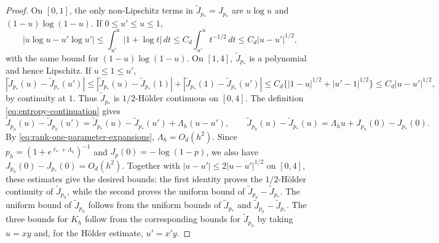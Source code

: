 \begin{proof}
On $[0,1]$, the only non-Lipschitz terms in
$\widetilde J_{p_*}=J_{p_*}$ are $u\log u$ and
$(1-u)\log(1-u)$.  If $0\le u'\le u\le1$,
\[
  |u\log u-u'\log u'|
  \le\int_{u'}^u|1+\log t|\,dt
  \le C_d\int_{u'}^ut^{-1/2}\,dt
  \le C_d|u-u'|^{1/2},
\]
with the same bound for $(1-u)\log(1-u)$.
On $[1,4]$, $\widetilde J_{p_*}$ is a polynomial and hence Lipschitz.
If $u\le1\le u'$, 
\[
  |\widetilde J_{p_*}(u)-\widetilde J_{p_*}(u')|
  \le |\widetilde J_{p_*}(u)-\widetilde J_{p_*}(1)|
    +|\widetilde J_{p_*}(1)-\widetilde J_{p_*}(u')|
  \le C_d\{|1-u|^{1/2}+|u'-1|^{1/2}\}
  \le C_d|u-u'|^{1/2},
\]
by continuity at $1$.
Thus $\widetilde J_{p_*}$ is $1/2$-H\"older continuous on $[0,4]$.
The definition \eqref{eq:entropy-continuation} gives
\[
  \widetilde J_{p_h}(u)-\widetilde J_{p_h}(u')
  =\widetilde J_{p_*}(u)-\widetilde J_{p_*}(u')
  +\Lambda_h(u-u'),
  \qquad
  \widetilde J_{p_h}(u)-\widetilde J_{p_*}(u)
  =\Lambda_hu+J_{p_h}(0)-J_{p_*}(0).
\]
By \eqref{eq:rank-one-parameter-expansions}, $\Lambda_h=O_d(h^2)$.
Since $p_h=(1+e^{\ell_*+\Lambda_h})^{-1}$ and
$J_p(0)=-\log(1-p)$, we also have
$J_{p_h}(0)-J_{p_*}(0)=O_d(h^2)$.
Together with $|u-u'|\le2|u-u'|^{1/2}$ on $[0,4]$, these estimates give the
desired bounds: the first identity proves the $1/2$-H\"older continuity of
$\widetilde J_{p_h}$, while the second proves the uniform bound of
$\widetilde J_{p_h}-\widetilde J_{p_*}$.
The uniform bound of $\widetilde J_{p_h}$ follows from the uniform bounds of
$\widetilde J_{p_*}$ and $\widetilde J_{p_h}-\widetilde J_{p_*}$.
The three bounds for $K_h$ follow from the corresponding bounds for
$\widetilde J_{p_h}$ by taking $u=xy$ and, for the H\"older estimate,
$u'=x'y$.
\end{proof}

